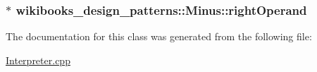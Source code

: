\subsubsection[{\texorpdfstring{right\+Operand}{rightOperand}}]{$\ast$ wikibooks\+\_\+design\+\_\+patterns\+::\+Minus\+::right\+Operand\hspace{0.3cm}{\ttfamily [private]}}\hypertarget{classwikibooks__design__patterns_1_1Minus_af555c67688bb374cb76ed7d99aa67220}{}\label{classwikibooks__design__patterns_1_1Minus_af555c67688bb374cb76ed7d99aa67220}


The documentation for this class was generated from the following file\+:\begin{DoxyCompactItemize}
\item 
\hyperlink{Interpreter_8cpp}{Interpreter.\+cpp}\end{DoxyCompactItemize}
